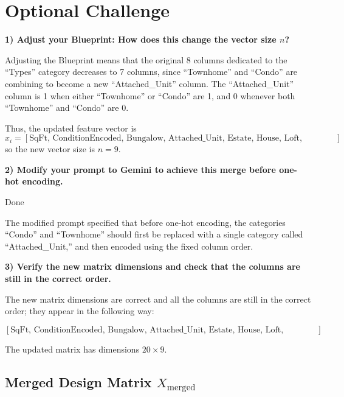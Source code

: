 \documentclass[11pt]{article}
\begin{document}
\section{Optional Challenge}

\textbf{1) Adjust your Blueprint: How does this change the vector size $n$?}

Adjusting the Blueprint means that the original 8 columns dedicated to the ``Types'' category decreases to 7 columns, since ``Townhome'' and ``Condo'' are combining to become a new ``Attached\_Unit'' column. The ``Attached\_Unit'' column is 1 when either ``Townhome'' or ``Condo'' are 1, and 0 whenever both ``Townhome'' and ``Condo'' are 0.

Thus, the updated feature vector is
\[
x_i = [\text{SqFt, ConditionEncoded, Bungalow, Attached\_Unit, Estate, House, Loft, Mansion, Studio}]
\]
so the new vector size is $n=9$.

\textbf{2) Modify your prompt to Gemini to achieve this merge before one-hot encoding.}

Done \checkmark

The modified prompt specified that before one-hot encoding, the categories ``Condo'' and ``Townhome'' should first be replaced with a single category called ``Attached\_Unit,'' and then encoded using the fixed column order.

\textbf{3) Verify the new matrix dimensions and check that the columns are still in the correct order.}

The new matrix dimensions are correct and all the columns are still in the correct order; they appear in the following way:

\[
[\text{SqFt, ConditionEncoded, Bungalow, Attached\_Unit, Estate, House, Loft, Mansion, Studio}]
\]

The updated matrix has dimensions $20 \times 9$.

\subsection*{Merged Design Matrix $X_{\text{merged}}$}
\end{document}
